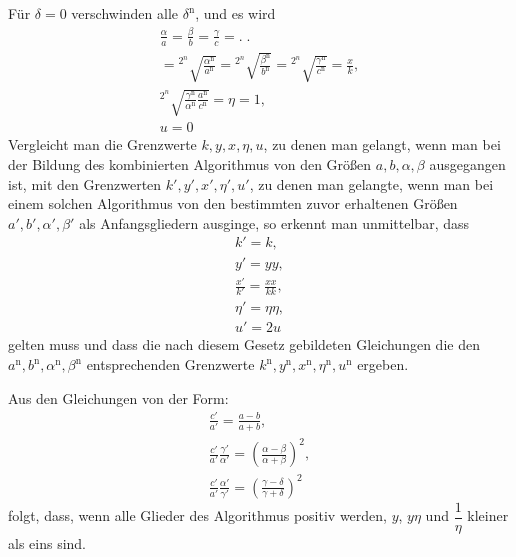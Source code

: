 Für $\delta=0$ verschwinden alle $\delta^{\mathrm n}$, und es wird
\[
\begin{gathered}\frac\alpha a=\frac\beta b=\frac\gamma c=.\;.
\\={}^{2^n}\!\surd{\frac{\alpha^{\mathrm n}}{a^{\mathrm n}}}
={}^{2^n}\!\surd{\frac{\beta^{\mathrm n}}{b^{\mathrm n}}}
={}^{2^n}\!\surd{\frac{\gamma^{\mathrm n}}{c^{\mathrm n}}}=\frac xk,\\[5pt]
{}^{2^n}\!\surd{\frac{\gamma^{\mathrm n}}{\alpha^{\mathrm n}}\frac{a^{\mathrm n}}{c^{\mathrm n}}}=\eta=1,\\[5pt] u=0\end{gathered}
\]
Vergleicht man die Grenzwerte $k,\allowbreak y,\allowbreak x,\allowbreak \eta,\allowbreak u$, zu denen man gelangt, wenn man bei der Bildung des kombinierten Algorithmus von den Größen $a,\allowbreak b,\allowbreak \alpha,\allowbreak \beta$ ausgegangen ist, mit den Grenzwerten $k',\allowbreak y',\allowbreak x',\allowbreak \eta',\allowbreak u'$, zu denen man gelangte, wenn man bei einem solchen Algorithmus von den bestimmten zuvor erhaltenen Größen $a',\allowbreak b',\allowbreak \alpha',\allowbreak \beta'$ als Anfangsgliedern ausginge, so erkennt man unmittelbar, dass
\[
\begin{gathered}k'=k,\\[5pt] y'=yy,\\[5pt]\frac{x'}{k'}=\frac{xx}{kk},\\[5pt]
\eta'=\eta\eta,\\[5pt] u'=2u\end{gathered}
\]
gelten muss und dass die nach diesem Gesetz gebildeten Gleichungen die den $a^{\mathrm n},\allowbreak b^{\mathrm n},\allowbreak \alpha^{\mathrm n},\allowbreak \beta^{\mathrm n}$ entsprechenden Grenzwerte $k^{\mathrm n},\allowbreak y^{\mathrm n},\allowbreak x^{\mathrm n},\allowbreak \eta^{\mathrm n},\allowbreak u^{\mathrm n}$ ergeben.

Aus den Gleichungen von der Form:
\[
\begin{gathered}\frac{c'}{a'}=\frac{a-b}{a+b},\\[5pt]
\frac{c'}{a'}\frac{\gamma'}{\alpha'}=\left(\frac{\alpha-\beta}{\alpha+\beta}\right)^2,\\[5pt]
\frac{c'}{a'}\frac{\alpha'}{\gamma'}=\left(\frac{\gamma-\delta}{\gamma+\delta}\right)^2\end{gathered}
\]
folgt, dass, wenn alle Glieder des Algorithmus positiv werden, $y$, $y\eta$ und
$\dfrac1\eta$ kleiner als eins sind.


